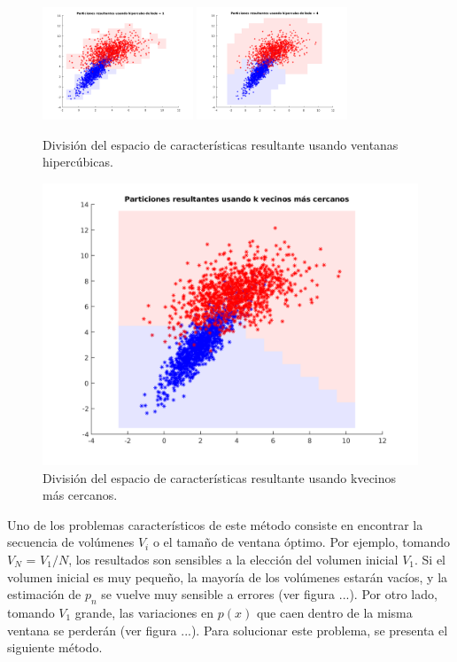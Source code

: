 \begin{figure}
\begin{minipage}{\textwidth}
    \begin{center}
        \includegraphics[width=0.4\textwidth]{img/tp3/ej2-2.png}
        \includegraphics[width=0.4\textwidth]{img/tp3/ej2-4.png}
    \end{center}
\label{minipage:ej2-B}
\end{minipage}
\caption{\footnotesize{División del espacio de características resultante usando ventanas hipercúbicas.}} 
\end{figure}

\begin{figure}[ht!]
\centering
\includegraphics[width=120mm]{img/tp3/ej2-5.png}
\caption{\footnotesize{División del espacio de características resultante usando kvecinos más cercanos.}} 
\end{figure}

Uno de los problemas característicos de este método consiste en encontrar la secuencia de volúmenes $V_i$ o el tamaño de ventana óptimo. Por ejemplo, tomando $V_N$ = $V_1 / N$, los resultados son sensibles a la elección del volumen inicial $V_1$. Si el volumen inicial es muy pequeño, la mayoría de los volúmenes estarán vacíos, y la estimación de $p_n$ se vuelve muy sensible a errores (ver figura ...). Por otro lado, tomando $V_1$ grande, las variaciones en $p(x)$ que caen dentro de la misma ventana se perderán (ver figura ...). Para solucionar este problema, se presenta el siguiente método.
